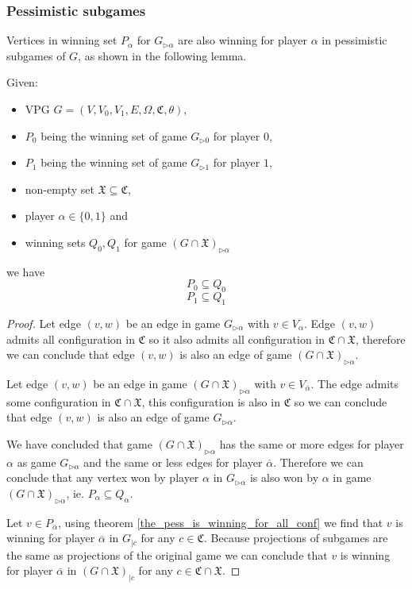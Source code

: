 \subsubsection{Pessimistic subgames}
Vertices in winning set $P_\alpha$ for $G_{\triangleright\alpha}$ are also winning for player $\alpha$ in pessimistic subgames of $G$, as shown in the following lemma.
\begin{lemma}
	\label{lem_pessimistic_subgames}
	Given:
	\begin{itemize}
		\item VPG $G = (V,V_0,V_1,E,\Omega, \mathfrak{C},\theta)$,
		\item $P_0$ being the winning set of game $G_{\triangleright0}$ for player $0$,
		\item $P_1$ being the winning set of game $G_{\triangleright1}$ for player $1$,
		\item non-empty set $\mathfrak{X} \subseteq \mathfrak{C}$,
		\item player $\alpha \in \{0,1\}$ and
		\item winning sets $Q_0,Q_1$ for game $(G \cap \mathfrak{X})_{\triangleright\alpha}$
	\end{itemize}
	we have
	\[ P_0 \subseteq Q_0 \]
	\[ P_1 \subseteq Q_1 \]
	\begin{proof}
		
		Let edge $(v,w)$ be an edge in game $G_{\triangleright\alpha}$ with $v \in V_\alpha$. Edge $(v,w)$ admits all configuration in $\mathfrak{C}$ so it also admits all configuration in $\mathfrak{C} \cap \mathfrak{X}$, therefore we can conclude that edge $(v,w)$ is also an edge of game $(G\cap \mathfrak{X})_{\triangleright\alpha}$.
		
		Let edge $(v,w)$ be an edge in game $(G \cap \mathfrak{X})_{\triangleright\alpha}$ with $v \in V_{\overline{\alpha}}$. The edge admits some configuration in $\mathfrak{C} \cap \mathfrak{X}$, this configuration is also in $\mathfrak{C}$ so we can conclude that edge $(v,w)$ is also an edge of game $G_{\triangleright\alpha}$.
		
		We have concluded that game $(G \cap \mathfrak{X})_{\triangleright\alpha}$ has the same or more edges for player $\alpha$ as game $G_{\triangleright\alpha}$ and the same or less edges for player $\overline{\alpha}$. Therefore we can conclude that any vertex won by player $\alpha$ in $G_{\triangleright\alpha}$ is also won by $\alpha$ in game $(G \cap \mathfrak{X})_{\triangleright\alpha}$, ie. $P_\alpha \subseteq Q_\alpha$.
		
		
		Let $v \in P_{\overline{\alpha}}$, using theorem \ref{the_pess_is_winning_for_all_conf} we find that $v$ is winning for player $\overline{\alpha}$ in $G_{|c}$ for any $c \in \mathfrak{C}$. Because projections of subgames are the same as projections of the original game we can conclude that $v$ is winning for player $\overline{\alpha}$ in $(G \cap \mathfrak{X})_{|c}$ for any $c \in \mathfrak{C} \cap \mathfrak{X}$.
		

\end{proof}
\end{lemma}
